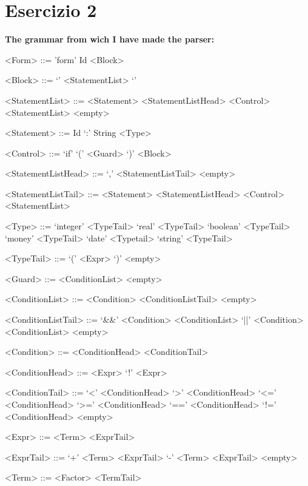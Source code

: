 \documentclass[10pt]{article}
\begin{document}
\section*{Esercizio 2}
\textbf{The grammar from wich I have made the parser:}
\setlength{\grammarparsep}{1pt plus 1pt minus 1pt} %
\setlength{\grammarindent}{12em} %
\begin{multicols}{2}
\begin{grammar}

<Form>	::=	'form'  Id  <Block>

<Block>	::=	 `{' <StatementList> `}'

<StatementList>	::=	<Statement> <StatementListHead>
\alt <Control> <StatementList>
\alt <empty> 

<Statement> ::=	Id `:' String <Type>	

<Control> 	::=	 `if'  `(' <Guard> `)' <Block>

<StatementListHead>	::= `,' <StatementListTail>
\alt <empty> 

<StatementListTail>  ::= <Statement> <StatementListHead>		
 <StatementList>	

<Type>	::=	`integer'	<TypeTail>	
\alt			`real'		<TypeTail>	
\alt			`boolean'	<TypeTail>	
\alt			`money'	<TypeTail>	
\alt			`date'		<Typetail>	
\alt			`string'	<TypeTail>

<TypeTail>	::=	`('	<Expr>	`)'	
\alt<empty>

<Guard>	::=	<ConditionList>	
\alt	<empty>

<ConditionList>	::=	<Condition>	<ConditionListTail>	
\alt	<empty>

<ConditionListTail>	::=	`&&'	<Condition>	<ConditionList>	
\alt					`||'	<Condition>	<ConditionList>	
\alt	<empty>
								
<Condition>	::=	<ConditionHead> <ConditionTail>

<ConditionHead>	::=	<Expr>		\alt	
					`!'	<Expr>

<ConditionTail>	::=	`<'		<ConditionHead>	
\alt				`>'		<ConditionHead>	
\alt				`<='	<ConditionHead>	
\alt				`>='	<ConditionHead>	
\alt				`=='	<ConditionHead>	
\alt				`!='	<ConditionHead>	
\alt	<empty>

<Expr>	::=	<Term>	<ExprTail>

<ExprTail>	::=	`+'     <Term>	<ExprTail>
\alt			`-'	<Term>	<ExprTail>	
\alt	<empty>

<Term>	::=	<Factor>	<TermTail>


\end{grammar}
\end{multicols}
\end{document}
